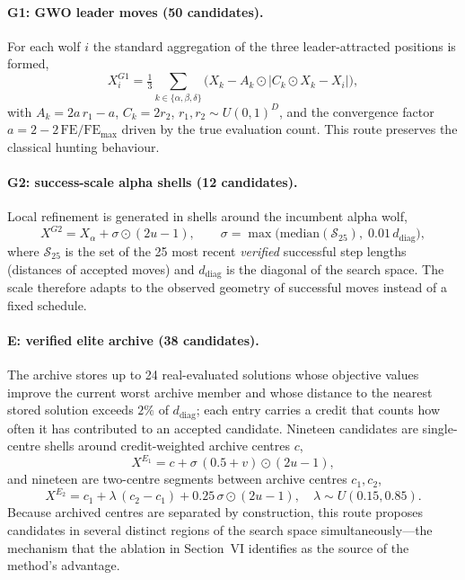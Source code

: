 \documentclass[journal]{IEEEtran}
\begin{document}
\paragraph{G1: GWO leader moves (50 candidates).}
For each wolf $i$ the standard aggregation of the three leader-attracted
positions is formed,
\begin{equation}
X_i^{G1}=\tfrac{1}{3}\sum_{k\in\{\alpha,\beta,\delta\}}
\bigl(X_k - A_k \odot |C_k \odot X_k - X_i|\bigr),
\end{equation}
with $A_k=2a\,r_1-a$, $C_k=2r_2$, $r_1,r_2\sim U(0,1)^D$, and the
convergence factor $a=2-2\,\mathrm{FE}/\mathrm{FE}_{\max}$ driven by the true
evaluation count. This route preserves the classical hunting behaviour.

\paragraph{G2: success-scale alpha shells (12 candidates).}
Local refinement is generated in shells around the incumbent alpha wolf,
\begin{equation}
X^{G2}=X_\alpha+\sigma\odot(2u-1),\qquad
\sigma=\max\!\bigl(\mathrm{median}(\mathcal S_{25}),\;
0.01\,d_{\mathrm{diag}}\bigr),
\end{equation}
where $\mathcal S_{25}$ is the set of the 25 most recent \emph{verified}
successful step lengths (distances of accepted moves) and $d_{\mathrm{diag}}$
is the diagonal of the search space. The scale therefore adapts to the
observed geometry of successful moves instead of a fixed schedule.

\paragraph{E: verified elite archive (38 candidates).}
The archive stores up to 24 real-evaluated solutions whose objective values
improve the current worst archive member and whose distance to the nearest
stored solution exceeds $2\%$ of $d_{\mathrm{diag}}$; each entry carries a
credit that counts how often it has contributed to an accepted candidate.
Nineteen candidates are single-centre shells around credit-weighted archive
centres $c$,
\begin{equation}
X^{E_1}=c+\sigma\,(0.5+v)\odot(2u-1),
\end{equation}
and nineteen are two-centre segments between archive centres $c_1,c_2$,
\begin{equation}
X^{E_2}=c_1+\lambda\,(c_2-c_1)
+0.25\,\sigma\odot(2u-1),\quad
\lambda\sim U(0.15,0.85).
\end{equation}
Because archived centres are separated by construction, this route proposes
candidates in several distinct regions of the search space simultaneously---the
mechanism that the ablation in Section~VI identifies as the source of the
method's advantage.
\end{document}
